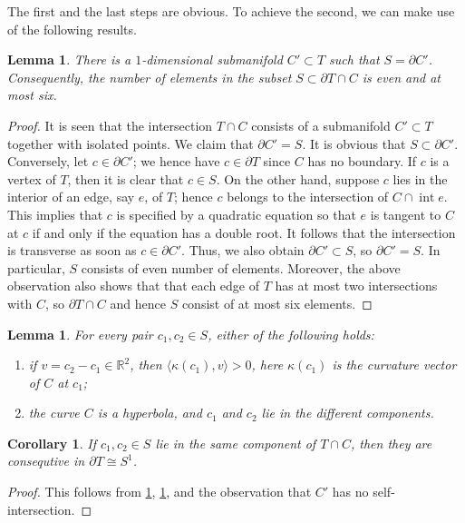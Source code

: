 \documentclass[pdftex,a4paper,12pt]{scrartcl}
\theoremstyle{plain}
\newtheorem{corollary}[theorem]{Corollary}
\newtheorem{lemma}[theorem]{Lemma}
\theoremstyle{definition}
\theoremstyle{remark}
\numberwithin{equation}{section}
\begin{document}
The first and the last steps are obvious.
To achieve the second, we can make use of the following results.

\begin{lemma}
\label{lem:S-bndry}
There is a $1$-dimensional submanifold $C'\subset T$ such that $S= \partial C'$.
Consequently, the number of elements in the subset $S\subset\partial T\cap C$ is even and at most six.
\end{lemma}
\begin{proof}
It is seen that the intersection $T\cap C$ consists of a submanifold $C'\subset T$ together with isolated points.
We claim that $\partial C'=S$.
It is obvious that $S\subset\partial C'$.
Conversely, let $c\in \partial C'$; we hence have $c\in\partial T$ since $C$ has no boundary.
If $c$ is a vertex of $T$, then it is clear that $c\in S$.
On the other hand, suppose $c$ lies in the interior of an edge, say $e$, of $T$; hence $c$ belongs to the intersection of $C\cap \operatorname{int}e$.
This implies that $c$ is specified by a quadratic equation so that $e$ is tangent to $C$ at $c$ if and only if the equation has a double root.
It follows that the intersection is transverse as soon as $c\in\partial C'$.
Thus, we also obtain $\partial C'\subset S$, so $\partial C'=S$.
In particular, $S$ consists of even number of elements.
Moreover, the above observation also shows that that each edge of $T$ has at most two intersections with $C$, so $\partial T\cap C$ and hence $S$ consist of at most six elements.
\end{proof}

\begin{lemma}
\label{lem:comp-curve}
For every pair $c_1,c_2\in S$, either of the following holds:
\begin{enumerate}[label=\upshape(\roman*)]
  \item if $v=c_2-c_1\in\mathbb R^2$, then $\langle\kappa(c_1),v\rangle > 0$, here $\kappa(c_1)$ is the curvature vector of $C$ at $c_1$;
  \item the curve $C$ is a hyperbola, and $c_1$ and $c_2$ lie in the different components.
\end{enumerate}
\end{lemma}

\begin{corollary}
If $c_1,c_2\in S$ lie in the same component of $T\cap C$, then they are consequtive in $\partial T\cong S^1$.
\end{corollary}
\begin{proof}
This follows from \cref{lem:S-bndry}, \cref{lem:comp-curve}, and the observation that $C'$ has no self-intersection.
\end{proof}
\end{document}
